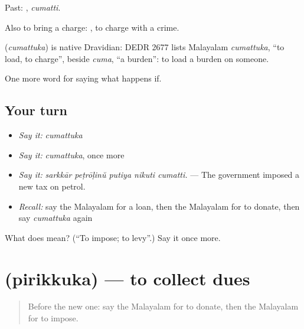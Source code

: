 Past: , \emph{cumatti}.

Also to bring a charge:  , to charge with a crime.

\begin{cousinweb}
\textbf{} (\emph{cumattuka}) is native Dravidian: DEDR 2677 lists Malayalam \emph{cumattuka}, \textquotedblleft{}to load, to charge\textquotedblright{}, beside \emph{cuma}, \textquotedblleft{}a burden\textquotedblright{}: to load a burden on someone.
\end{cousinweb}

\begin{grammarlens}[title={What you've built}]
One more word for saying what happens if.
\end{grammarlens}

\subsection*{Your turn}
\begin{itemize}
\raggedright
  \item \emph{Say it:} \emph{cumattuka}
  \item \emph{Say it:} \emph{cumattuka}, once more
  \item \emph{Say it:} \emph{sarkkār peṭrōḷinŭ putiya nikuti cumatti.} — The government imposed a new tax on petrol.
  \item \emph{Recall:} say the Malayalam for a loan, then the Malayalam for to donate, then say \emph{cumattuka} again
\end{itemize}

\begin{tcolorbox}[breakable,colback=teal!4,colframe=teal!35!black,title={Before you move on}]
What does  mean? (\textquotedblleft{}To impose; to levy\textquotedblright{}.) Say it once more.
\end{tcolorbox}
\section[\texorpdfstring{\ml{പിരിക്കുക} (pirikkuka)}{പിരിക്കുക (pirikkuka)}]{ (pirikkuka) — to collect dues}

\label{lesson:ML-C459-pirikkuka}



\begin{quote}
Before the new one: say the Malayalam for to donate, then the Malayalam for to impose.
\end{quote}

